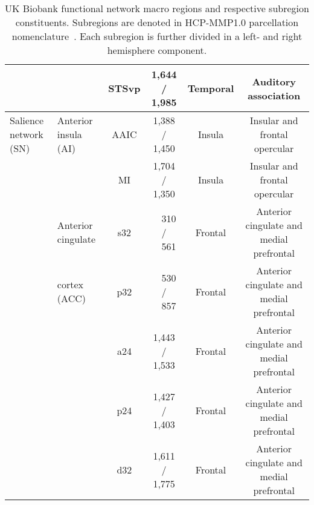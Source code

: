 \begin{table*}[t]
{\begin{tabular}{ l | l | c | c | c | c }
                                      &                                 & STSvp                 & 1,644 / 1,985         & Temporal              & Auditory association                      \\
      \midrule
      Salience network (SN)           & Anterior insula (AI)            & AAIC                  & 1,388 / 1,450         & Insula                & Insular and frontal opercular             \\
                                      &                                 & MI                    & 1,704 / 1,350         & Insula                & Insular and frontal opercular             \\
                                      \cmidrule{2-6}
                                      & Anterior cingulate              & s32                   & ~~310 / ~~561         & Frontal               & Anterior cingulate and medial prefrontal  \\
                                      & cortex (ACC)                    & p32                   & ~~530 / ~~857         & Frontal               & Anterior cingulate and medial prefrontal  \\
                                      &                                 & a24                   & 1,443 / 1,533         & Frontal               & Anterior cingulate and medial prefrontal  \\
                                      &                                 & p24                   & 1,427 / 1,403         & Frontal               & Anterior cingulate and medial prefrontal  \\
                                      &                                 & d32                   & 1,611 / 1,775         & Frontal               & Anterior cingulate and medial prefrontal  \\
      \bottomrule
    \end{tabular}
  }
  \caption{
    UK Biobank functional network macro regions and respective subregion constituents.
    Subregions are denoted in HCP-MMP1.0 parcellation nomenclature~\parencite{Glasser2016}.
    Each subregion is further divided in a left- and right hemisphere component.
  }
  \label{tab:ukbiobank-functional-networks}
\end{table*}
